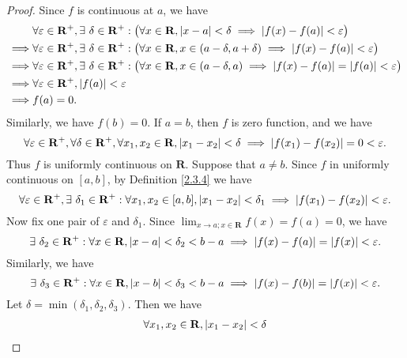 \begin{proof}
    Since \(f\) is continuous at \(a\), we have
    \begin{align*}
                 & \forall \varepsilon \in \mathbf{R}^+, \exists\ \delta \in \mathbf{R}^+ : \big(\forall x \in \mathbf{R}, \abs*{x - a} < \delta \implies \abs*{f(x) - f(a)} < \varepsilon\big)               \\
        \implies & \forall \varepsilon \in \mathbf{R}^+, \exists\ \delta \in \mathbf{R}^+ : \big(\forall x \in \mathbf{R}, x \in (a - \delta, a + \delta) \implies \abs*{f(x) - f(a)} < \varepsilon\big)      \\
        \implies & \forall \varepsilon \in \mathbf{R}^+, \exists\ \delta \in \mathbf{R}^+ : \big(\forall x \in \mathbf{R}, x \in (a - \delta, a) \implies \abs*{f(x) - f(a)} = \abs*{f(a)} < \varepsilon\big) \\
        \implies & \forall \varepsilon \in \mathbf{R}^+, \abs*{f(a)} < \varepsilon                                                                                                                            \\
        \implies & f(a) = 0.
    \end{align*}
    Similarly, we have \(f(b) = 0\).
    If \(a = b\), then \(f\) is zero function, and we have
    \[
        \forall \varepsilon \in \mathbf{R}^+, \forall \delta \in \mathbf{R}^+, \forall x_1, x_2 \in \mathbf{R}, \abs*{x_1 - x_2} < \delta \implies \abs*{f(x_1) - f(x_2)} = 0 < \varepsilon.
    \]
    Thus \(f\) is uniformly continuous on \(\mathbf{R}\).
    Suppose that \(a \neq b\).
    Since \(f\) in uniformly continuous on \([a, b]\), by Definition \ref{2.3.4} we have
    \[
        \forall \varepsilon \in \mathbf{R}^+, \exists\ \delta_1 \in \mathbf{R}^+ : \forall x_1, x_2 \in [a, b], \abs*{x_1 - x_2} < \delta_1 \implies \abs*{f(x_1) - f(x_2)} < \varepsilon.
    \]
    Now fix one pair of \(\varepsilon\) and \(\delta_1\).
    Since \(\lim_{x \to a ; x \in \mathbf{R}} f(x) = f(a) = 0\), we have
    \[
        \exists\ \delta_2 \in \mathbf{R}^+ : \forall x \in \mathbf{R}, \abs*{x - a} < \delta_2 < b - a \implies \abs*{f(x) - f(a)} = \abs*{f(x)} < \varepsilon.
    \]
    Similarly, we have
    \[
        \exists\ \delta_3 \in \mathbf{R}^+ : \forall x \in \mathbf{R}, \abs*{x - b} < \delta_3 < b - a \implies \abs*{f(x) - f(b)} = \abs*{f(x)} < \varepsilon.
    \]
    Let \(\delta = \min(\delta_1, \delta_2, \delta_3)\).
    Then we have
    \begin{align*}
                 & \forall x_1, x_2 \in \mathbf{R}, \abs*{x_1 - x_2} < \delta                                                                                                   \\

\end{align*}
\end{proof}
